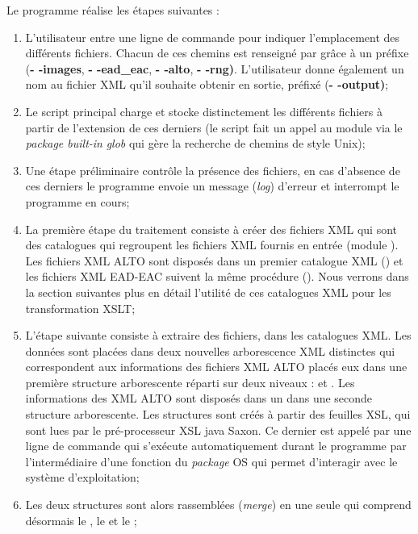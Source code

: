 Le programme réalise les étapes suivantes :
\begin{enumerate}
    \item L'utilisateur entre une ligne de commande pour indiquer l'emplacement des différents fichiers. Chacun de ces chemins est renseigné par grâce à un préfixe (\textbf{- -images}, \textbf{- -ead\_eac}, \textbf{- -alto}, \textbf{- -rng)}. L'utilisateur donne également un nom au fichier XML qu'il souhaite obtenir en sortie, préfixé (\textbf{- -output)};
    \item Le script principal charge et stocke distinctement les différents fichiers à partir de l'extension de ces derniers (le script fait un appel au module  via le \textit{package built-in} \textit{glob} qui gère la recherche de chemins de style Unix);
    \item Une étape préliminaire contrôle la présence des fichiers, en cas d'absence de ces derniers le programme envoie un message (\textit{log}) d'erreur et interrompt le programme en cours;
    \item La première étape du traitement consiste à créer des fichiers XML qui sont des catalogues qui regroupent les fichiers XML fournis en entrée (module ). Les fichiers XML ALTO sont disposés dans un premier catalogue XML () et les fichiers XML EAD-EAC suivent la même procédure (). Nous verrons dans la section suivantes plus en détail l'utilité de ces catalogues XML pour les transformation XSLT;
    \item L'étape suivante consiste à extraire des fichiers, dans les catalogues XML. Les données sont placées dans deux nouvelles arborescence XML distinctes qui correspondent aux informations des fichiers XML ALTO placés eux dans une première structure arborescente réparti sur deux niveaux :  et . Les informations des XML ALTO sont disposés dans un  dans une seconde structure arborescente. Les structures sont créés à partir des feuilles XSL, qui sont lues par le pré-processeur XSL java Saxon. Ce dernier est appelé par une ligne de commande qui s'exécute automatiquement durant le programme par l'intermédiaire d'une fonction du \textit{package} OS qui permet d'interagir avec le système d'exploitation;
    \item Les deux structures sont alors rassemblées (\textit{merge}) en une seule qui comprend désormais le , le  et le ;

\end{enumerate}
